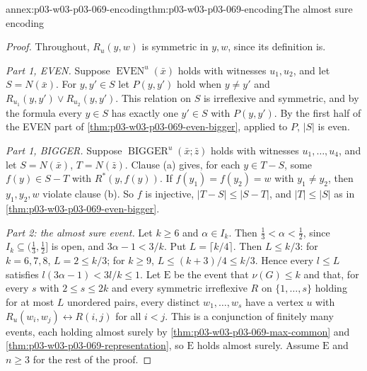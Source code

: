 \begin{annexitem}{annex:p03-w03-p03-069-encoding}{thm:p03-w03-p03-069-encoding}{The almost sure encoding}
\begin{proof}
Throughout, \(R_u(y,w)\) is symmetric in \(y,w\), since its definition is.

\emph{Part 1, EVEN.}  Suppose \(\operatorname{EVEN}^u(\bar x)\) holds with
witnesses \(u_1,u_2\), and let \(S=N(\bar x)\).  For \(y,y'\in S\) let
\(P(y,y')\) hold when \(y\neq y'\) and
\(R_{u_1}(y,y')\vee R_{u_2}(y,y')\).  This relation on \(S\) is irreflexive
and symmetric, and by the formula every \(y\in S\) has exactly one
\(y'\in S\) with \(P(y,y')\).  By the first half of the EVEN part of
\cref{thm:p03-w03-p03-069-even-bigger}, applied to \(P\), \(|S|\) is even.

\emph{Part 1, BIGGER.}  Suppose \(\operatorname{BIGGER}^u(\bar x;\bar z)\)
holds with witnesses \(u_1,\ldots,u_4\), and let \(S=N(\bar x)\),
\(T=N(\bar z)\).  Clause (a) gives, for each \(y\in T-S\), some \(f(y)\in
S-T\) with \(R^*(y,f(y))\).  If \(f(y_1)=f(y_2)=w\) with \(y_1\neq y_2\), then
\(y_1,y_2,w\) violate clause (b).  So \(f\) is injective,
\(|T-S|\leq|S-T|\), and \(|T|\leq|S|\) as in
\cref{thm:p03-w03-p03-069-even-bigger}.

\emph{Part 2: the almost sure event.}  Let \(k\geq6\) and \(\alpha\in I_k\).
Then \(\tfrac13<\alpha<\tfrac12\), since \(I_k\subseteq(\tfrac13,\tfrac12]\)
is open, and \(3\alpha-1<3/k\).  Put \(L=\lceil k/4\rceil\).  Then
\(L\leq k/3\): for \(k=6,7,8\), \(L=2\leq k/3\); for \(k\geq9\),
\(L\leq(k+3)/4\leq k/3\).  Hence every \(l\leq L\) satisfies
\(l(3\alpha-1)<3l/k\leq1\).  Let \(\mathrm E\) be the event that
\(\nu(G)\leq k\) and that, for every \(s\) with \(2\leq s\leq2k\) and every
symmetric irreflexive \(R\) on \(\{1,\ldots,s\}\) holding for at most \(L\)
unordered pairs, every distinct \(w_1,\ldots,w_s\) have a vertex \(u\) with
\(R_u(w_i,w_j)\leftrightarrow R(i,j)\) for all \(i<j\).  This is a
conjunction of finitely many events, each holding almost surely by
\cref{thm:p03-w03-p03-069-max-common} and
\cref{thm:p03-w03-p03-069-representation}, so \(\mathrm E\) holds almost
surely.  Assume \(\mathrm E\) and \(n\geq3\) for the rest of the proof.


\end{proof}
\end{annexitem}
